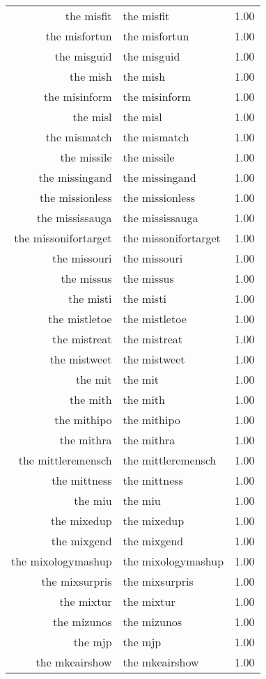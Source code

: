 \begin{table}[ht]
\begin{tabular}{rlr}
  the misfit & the misfit & 1.00 \\ 
  the misfortun & the misfortun & 1.00 \\ 
  the misguid & the misguid & 1.00 \\ 
  the mish & the mish & 1.00 \\ 
  the misinform & the misinform & 1.00 \\ 
  the misl & the misl & 1.00 \\ 
  the mismatch & the mismatch & 1.00 \\ 
  the missile & the missile & 1.00 \\ 
  the missingand & the missingand & 1.00 \\ 
  the missionless & the missionless & 1.00 \\ 
  the mississauga & the mississauga & 1.00 \\ 
  the missonifortarget & the missonifortarget & 1.00 \\ 
  the missouri & the missouri & 1.00 \\ 
  the missus & the missus & 1.00 \\ 
  the misti & the misti & 1.00 \\ 
  the mistletoe & the mistletoe & 1.00 \\ 
  the mistreat & the mistreat & 1.00 \\ 
  the mistweet & the mistweet & 1.00 \\ 
  the mit & the mit & 1.00 \\ 
  the mith & the mith & 1.00 \\ 
  the mithipo & the mithipo & 1.00 \\ 
  the mithra & the mithra & 1.00 \\ 
  the mittleremensch & the mittleremensch & 1.00 \\ 
  the mittness & the mittness & 1.00 \\ 
  the miu & the miu & 1.00 \\ 
  the mixedup & the mixedup & 1.00 \\ 
  the mixgend & the mixgend & 1.00 \\ 
  the mixologymashup & the mixologymashup & 1.00 \\ 
  the mixsurpris & the mixsurpris & 1.00 \\ 
  the mixtur & the mixtur & 1.00 \\ 
  the mizunos & the mizunos & 1.00 \\ 
  the mjp & the mjp & 1.00 \\ 
  the mkeairshow & the mkeairshow & 1.00 \\ 

\end{tabular}
\end{table}
